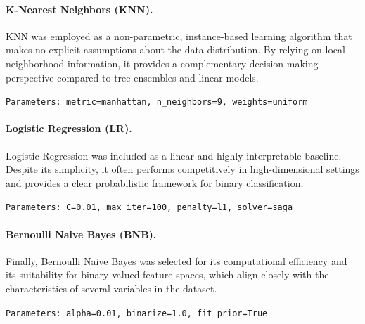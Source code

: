 \paragraph{K-Nearest Neighbors (KNN).}
KNN was employed as a non-parametric, instance-based learning algorithm that makes no explicit assumptions about the data distribution. By relying on local neighborhood information, it provides a complementary decision-making perspective compared to tree ensembles and linear models. 
\begin{tcolorbox}[colback=gray!5!white,colframe=gray!50!black,
                  boxrule=0.5pt,arc=2pt, left=1mm, right=1mm, top=0.5mm, bottom=0.5mm]
\texttt{Parameters: metric=manhattan, n\_neighbors=9, weights=uniform}
\end{tcolorbox}

\paragraph{Logistic Regression (LR).}
Logistic Regression was included as a linear and highly interpretable baseline. Despite its simplicity, it often performs competitively in high-dimensional settings and provides a clear probabilistic framework for binary classification. 
\begin{tcolorbox}[colback=gray!5!white,colframe=gray!50!black,
                  boxrule=0.5pt,arc=2pt, left=1mm, right=1mm, top=0.5mm, bottom=0.5mm]
\texttt{Parameters: C=0.01, max\_iter=100, penalty=l1, solver=saga}
\end{tcolorbox}

\paragraph{Bernoulli Naive Bayes (BNB).}
Finally, Bernoulli Naive Bayes was selected for its computational efficiency and its suitability for binary-valued feature spaces, which align closely with the characteristics of several variables in the dataset. 
\begin{tcolorbox}[colback=gray!5!white,colframe=gray!50!black,
                  boxrule=0.5pt,arc=2pt, left=1mm, right=1mm, top=0.5mm, bottom=0.5mm]
\texttt{Parameters: alpha=0.01, binarize=1.0, fit\_prior=True}
\end{tcolorbox}


